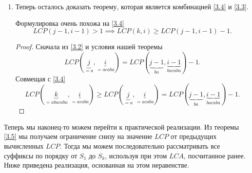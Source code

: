 \begin{enumerate}
\begin{proof}
                        Теперь заметим, что
                        \[
                                \underbrace{Suf^{-1}[k]}_{=abacaba} = \underbrace{Suf^{-1}[i]}_{=acaba} - 1     
                        .\] 
                        Т.е. мы берём предыдущий суффикс в $Suf$ перед $acaba$. Тогда получаем
                        \[
                                \underbrace{Suf^{-1}[j]}_{=a} \leq \underbrace{Suf^{-1}[k]}_{=abacaba} 
                                < \underbrace{Suf^{-1}[i]}_{=acaba}
                        .\] 
                        И наконец из \ref{3.1}
                        \[
                                LCP(\underbrace{j}_{=a}, \underbrace{i}_{=acaba}) \leq 
                                LCP(\underbrace{k}_{=abacaba}, \underbrace{i}_{=acaba})
                        .\] 
                \end{proof} 
        \item Теперь осталось доказать теорему, которая является комбинацией \ref{3.4} и \ref{3.3}. 
                \begin{theorem}[]
                        \label{3.5}
                        Формулировка очень похожа на \ref{3.4}
                        \[
                                LCP(j-1, i-1) > 1 \implies LCP(k, i) \geq LCP(j-1, i-1) - 1
                        .\]          
                \end{theorem}
                \begin{proof}
                        Сначала из \ref{3.2} и условия нашей теоремы
                        \[
                                LCP(\underbrace{j}_{=a}, \underbrace{i}_{=acaba}) = 
                                LCP(\underbrace{j-1}_{ba}, \underbrace{i-1}_{bacaba}) - 1
                        .\] 
                        Совмещая с \ref{3.4}
                        \[
                                LCP(\underbrace{k}_{=abacaba}, \underbrace{i}_{=acaba}) 
                                \geq LCP(\underbrace{j}_{=a}, \underbrace{i}_{=acaba}) =
                                LCP(\underbrace{j-1}_{ba}, \underbrace{i-1}_{bacaba}) - 1
                        .\] 
                \end{proof}
\end{enumerate}

Теперь мы наконец-то можем перейти к практической реализации. Из теоремы \ref{3.5} мы получаем ограничение
снизу на значение $LCP$ от предыдущих вычисленных $LCP$. Тогда мы можем последовательно рассматривать
все суффиксы по порядку от $S_1$ до $S_{k}$, используя при этом $LCA$, посчитанное ранее. Ниже приведена
реализация, основанная на этом неравенстве.

